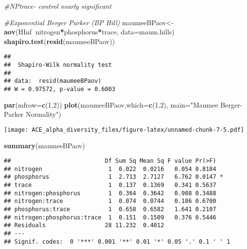 \documentclass[]{article}
\newenvironment{Shaded}{\begin{snugshade}}{\end{snugshade}}
\newcommand{\KeywordTok}[1]{\textcolor[rgb]{0.13,0.29,0.53}{\textbf{#1}}}
\newcommand{\DataTypeTok}[1]{\textcolor[rgb]{0.13,0.29,0.53}{#1}}
\newcommand{\DecValTok}[1]{\textcolor[rgb]{0.00,0.00,0.81}{#1}}
\newcommand{\StringTok}[1]{\textcolor[rgb]{0.31,0.60,0.02}{#1}}
\newcommand{\CommentTok}[1]{\textcolor[rgb]{0.56,0.35,0.01}{\textit{#1}}}
\newcommand{\OperatorTok}[1]{\textcolor[rgb]{0.81,0.36,0.00}{\textbf{#1}}}
\newcommand{\NormalTok}[1]{#1}
\begin{document}
\begin{Shaded}
\begin{Highlighting}[]
\CommentTok{#NPtrace- control nearly significant}

\CommentTok{#Exponential Berger Parker (BP Hill)}
\NormalTok{maumeeBPaov<-}\KeywordTok{aov}\NormalTok{(HInf}\OperatorTok{~}\NormalTok{nitrogen}\OperatorTok{*}\NormalTok{phosphorus}\OperatorTok{*}\NormalTok{trace, }\DataTypeTok{data=}\NormalTok{maum.hills)}
\KeywordTok{shapiro.test}\NormalTok{(}\KeywordTok{resid}\NormalTok{(maumeeBPaov))}
\end{Highlighting}
\end{Shaded}

\begin{verbatim}
## 
##  Shapiro-Wilk normality test
## 
## data:  resid(maumeeBPaov)
## W = 0.97572, p-value = 0.6003
\end{verbatim}

\begin{Shaded}
\begin{Highlighting}[]
\KeywordTok{par}\NormalTok{(}\DataTypeTok{mfrow=}\KeywordTok{c}\NormalTok{(}\DecValTok{1}\NormalTok{,}\DecValTok{2}\NormalTok{))}
\KeywordTok{plot}\NormalTok{(maumeeBPaov,}\DataTypeTok{which=}\KeywordTok{c}\NormalTok{(}\DecValTok{1}\NormalTok{,}\DecValTok{2}\NormalTok{), }\DataTypeTok{main=}\StringTok{"Maumee Berger-Parker Normality"}\NormalTok{)}
\end{Highlighting}
\end{Shaded}

\texttt{[image: ACE\_alpha\_diversity\_files/figure-latex/unnamed-chunk-7-5.pdf]}

\begin{Shaded}
\begin{Highlighting}[]
\KeywordTok{summary}\NormalTok{(maumeeBPaov)}
\end{Highlighting}
\end{Shaded}

\begin{verbatim}
##                           Df Sum Sq Mean Sq F value Pr(>F)  
## nitrogen                   1  0.022  0.0216   0.054 0.8184  
## phosphorus                 1  2.713  2.7127   6.762 0.0147 *
## trace                      1  0.137  0.1369   0.341 0.5637  
## nitrogen:phosphorus        1  0.364  0.3642   0.908 0.3488  
## nitrogen:trace             1  0.074  0.0744   0.186 0.6700  
## phosphorus:trace           1  0.658  0.6582   1.641 0.2107  
## nitrogen:phosphorus:trace  1  0.151  0.1509   0.376 0.5446  
## Residuals                 28 11.232  0.4012                 
## ---
## Signif. codes:  0 '***' 0.001 '**' 0.01 '*' 0.05 '.' 0.1 ' ' 1
\end{verbatim}
\end{document}
